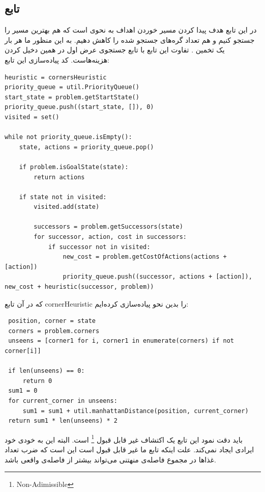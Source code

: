 \documentclass[11pt, a4paper, oneside]{book}
\begin{document}
	\subsection{تابع }
	در این تابع هدف پیدا کردن مسیر خوردن اهداف به نحوی است که هم بهترین مسیر را جستجو کنیم و هم تعداد گره‌های جستجو شده را کاهش دهیم. به این منظور ما هر بار یک تخمین . تفاوت این تابع با تابع جستجوی عرض اول در همین دخیل کردن هزینه‌هاست. کد پیاده‌سازی این تابع:
\begin{LTR}
	\begin{verbatim}
heuristic = cornersHeuristic
priority_queue = util.PriorityQueue()
start_state = problem.getStartState()
priority_queue.push((start_state, []), 0)
visited = set()

while not priority_queue.isEmpty():
    state, actions = priority_queue.pop()

    if problem.isGoalState(state):
        return actions

    if state not in visited:
        visited.add(state)

        successors = problem.getSuccessors(state)
        for successor, action, cost in successors:
            if successor not in visited:
                new_cost = problem.getCostOfActions(actions + [action])
                priority_queue.push((successor, actions + [action]), new_cost + heuristic(successor, problem))

	\end{verbatim}
\end{LTR}
 که در آن تابع cornerHeuristic را بدین نحو پیاده‌سازی کرده‌ایم:
 \begin{LTR}
 	\begin{verbatim}
 position, corner = state
 corners = problem.corners
 unseens = [corner1 for i, corner1 in enumerate(corners) if not corner[i]]
 
 if len(unseens) == 0:
     return 0
 sum1 = 0
 for current_corner in unseens:
     sum1 = sum1 + util.manhattanDistance(position, current_corner)
 return sum1 * len(unseens) * 2
 	\end{verbatim}
 \end{LTR}
	باید دقت نمود این تابع یک اکتشاف غیر قابل قبول 
	\footnote{Non-Adimissible} 
	است. البته این به خودی خود ایرادی ایجاد نمی‌کند. علت اینکه تابع ما غیر قابل قبول است این است که ضرب تعداد غذاها در مجموع فاصله‌ی منهتنی می‌تواند بیشتر از فاصله‌ی واقعی باشد. 
	
\end{document}
